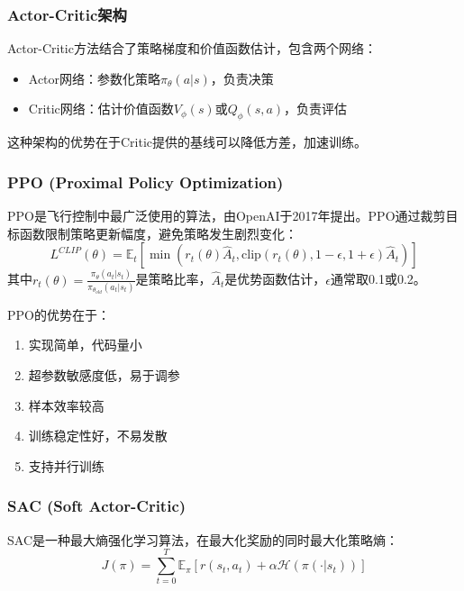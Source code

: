 \documentclass[12pt,a4paper]{ctexart}
\begin{document}
\subsubsection{Actor-Critic架构}

Actor-Critic方法结合了策略梯度和价值函数估计，包含两个网络：
\begin{itemize}
    \item Actor网络：参数化策略$\pi_{\theta}(a|s)$，负责决策
    \item Critic网络：估计价值函数$V_{\phi}(s)$或$Q_{\phi}(s,a)$，负责评估
\end{itemize}

这种架构的优势在于Critic提供的基线可以降低方差，加速训练。

\subsubsection{PPO (Proximal Policy Optimization)}

PPO是飞行控制中最广泛使用的算法，由OpenAI于2017年提出。PPO通过裁剪目标函数限制策略更新幅度，避免策略发生剧烈变化：
\begin{equation}
    L^{CLIP}(\theta) = \mathbb{E}_t\left[\min\left(r_t(\theta)\hat{A}_t, \text{clip}(r_t(\theta), 1-\epsilon, 1+\epsilon)\hat{A}_t\right)\right]
\end{equation}
其中$r_t(\theta) = \frac{\pi_{\theta}(a_t|s_t)}{\pi_{\theta_{old}}(a_t|s_t)}$是策略比率，$\hat{A}_t$是优势函数估计，$\epsilon$通常取0.1或0.2。

PPO的优势在于：
\begin{enumerate}
    \item 实现简单，代码量小
    \item 超参数敏感度低，易于调参
    \item 样本效率较高
    \item 训练稳定性好，不易发散
    \item 支持并行训练
\end{enumerate}

\subsubsection{SAC (Soft Actor-Critic)}

SAC是一种最大熵强化学习算法，在最大化奖励的同时最大化策略熵：
\begin{equation}
    J(\pi) = \sum_{t=0}^{T} \mathbb{E}_{\pi}\left[r(s_t, a_t) + \alpha \mathcal{H}(\pi(\cdot|s_t))\right]
\end{equation}
\end{document}
